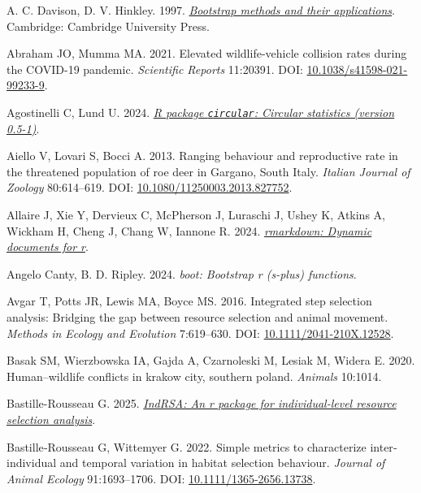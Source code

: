 \documentclass[10pt,a4paper]{article}
\newlength{\cslhangindent}
\newenvironment{CSLReferences}[2] %
 {\begin{list}{}{%
  \setlength{\itemindent}{0pt}
  \setlength{\leftmargin}{0pt}
  \setlength{\parsep}{0pt}
  \ifodd #1
   \setlength{\leftmargin}{\cslhangindent}
   \setlength{\itemindent}{-1\cslhangindent}
  \fi
  \setlength{\itemsep}{#2\baselineskip}}}
 {\end{list}}
\begin{document}
\protect{}\label{refs}
\begin{CSLReferences}{1}{0}
A. C. Davison, D. V. Hinkley. 1997. \emph{\href{https://doi:10.1017/CBO9780511802843}{Bootstrap methods and their applications}}. Cambridge: Cambridge University Press.

Abraham JO, Mumma MA. 2021. Elevated wildlife-vehicle collision rates during the {COVID}-19 pandemic. \emph{Scientific Reports} 11:20391. DOI: \href{https://doi.org/10.1038/s41598-021-99233-9}{10.1038/s41598-021-99233-9}.

Agostinelli C, Lund U. 2024. \emph{\href{https://CRAN.R-project.org/package=circular}{{R} package \texttt{circular}: Circular statistics (version 0.5-1)}}.

Aiello V, Lovari S, Bocci A. 2013. Ranging behaviour and reproductive rate in the threatened population of roe deer in {Gargano}, {South} {Italy}. \emph{Italian Journal of Zoology} 80:614--619. DOI: \href{https://doi.org/10.1080/11250003.2013.827752}{10.1080/11250003.2013.827752}.

Allaire J, Xie Y, Dervieux C, McPherson J, Luraschi J, Ushey K, Atkins A, Wickham H, Cheng J, Chang W, Iannone R. 2024. \emph{\href{https://github.com/rstudio/rmarkdown}{{rmarkdown}: Dynamic documents for r}}.

Angelo Canty, B. D. Ripley. 2024. \emph{{boot}: Bootstrap r (s-plus) functions}.

Avgar T, Potts JR, Lewis MA, Boyce MS. 2016. Integrated step selection analysis: Bridging the gap between resource selection and animal movement. \emph{Methods in Ecology and Evolution} 7:619--630. DOI: \href{https://doi.org/10.1111/2041-210X.12528}{10.1111/2041-210X.12528}.

Basak SM, Wierzbowska IA, Gajda A, Czarnoleski M, Lesiak M, Widera E. 2020. Human--wildlife conflicts in krakow city, southern poland. \emph{Animals} 10:1014.

Bastille-Rousseau G. 2025. \emph{\href{https://github.com/BastilleRousseau/IndRSA}{IndRSA: An r package for individual-level resource selection analysis}}.

Bastille‐Rousseau G, Wittemyer G. 2022. Simple metrics to characterize inter‐individual and temporal variation in habitat selection behaviour. \emph{Journal of Animal Ecology} 91:1693--1706. DOI: \href{https://doi.org/10.1111/1365-2656.13738}{10.1111/1365-2656.13738}.


\end{CSLReferences}
\end{document}
